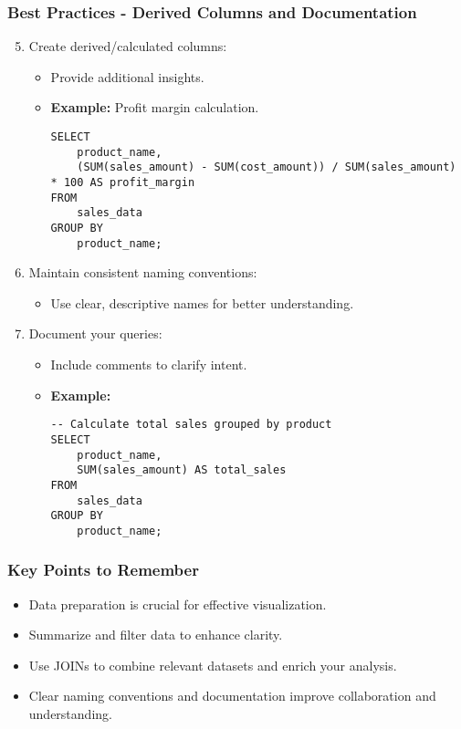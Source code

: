 \documentclass{beamer}
\begin{document}
\begin{frame}[fragile]
    \frametitle{Best Practices - Derived Columns and Documentation}
    \begin{enumerate}
        \setcounter{enumi}{4}
        \item Create derived/calculated columns:
        \begin{itemize}
            \item Provide additional insights.
            \item \textbf{Example:} Profit margin calculation.
            \begin{lstlisting}
SELECT 
    product_name, 
    (SUM(sales_amount) - SUM(cost_amount)) / SUM(sales_amount) * 100 AS profit_margin
FROM 
    sales_data
GROUP BY 
    product_name;
            \end{lstlisting}
        \end{itemize}
        
        \item Maintain consistent naming conventions:
        \begin{itemize}
            \item Use clear, descriptive names for better understanding.
        \end{itemize}
        
        \item Document your queries:
        \begin{itemize}
            \item Include comments to clarify intent.
            \item \textbf{Example:}
            \begin{lstlisting}
-- Calculate total sales grouped by product
SELECT 
    product_name, 
    SUM(sales_amount) AS total_sales
FROM 
    sales_data
GROUP BY 
    product_name;
            \end{lstlisting}
        \end{itemize}
    \end{enumerate}
\end{frame}

\begin{frame}
    \frametitle{Key Points to Remember}
    \begin{itemize}
        \item Data preparation is crucial for effective visualization.
        \item Summarize and filter data to enhance clarity.
        \item Use JOINs to combine relevant datasets and enrich your analysis.
        \item Clear naming conventions and documentation improve collaboration and understanding.
    \end{itemize}
\end{frame}
\end{document}

